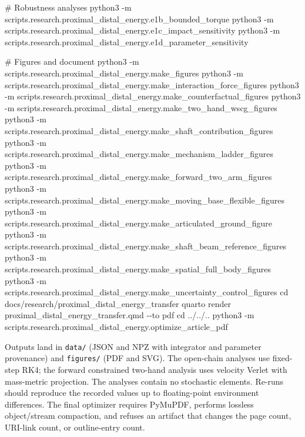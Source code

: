 \documentclass[
  letterpaper,
]{report}
\newenvironment{Shaded}{\begin{snugshade}}{\end{snugshade}}
\newcommand{\AttributeTok}[1]{\textcolor[rgb]{0.40,0.45,0.13}{#1}}
\newcommand{\BuiltInTok}[1]{\textcolor[rgb]{0.00,0.23,0.31}{#1}}
\newcommand{\CommentTok}[1]{\textcolor[rgb]{0.37,0.37,0.37}{#1}}
\newcommand{\ExtensionTok}[1]{\textcolor[rgb]{0.00,0.23,0.31}{#1}}
\newcommand{\NormalTok}[1]{\textcolor[rgb]{0.00,0.23,0.31}{#1}}
\begin{document}
\begin{Shaded}
\begin{Highlighting}[]
\CommentTok{\# Robustness analyses}
\ExtensionTok{python3} \AttributeTok{{-}m}\NormalTok{ scripts.research.proximal\_distal\_energy.e1b\_bounded\_torque}
\ExtensionTok{python3} \AttributeTok{{-}m}\NormalTok{ scripts.research.proximal\_distal\_energy.e1c\_impact\_sensitivity}
\ExtensionTok{python3} \AttributeTok{{-}m}\NormalTok{ scripts.research.proximal\_distal\_energy.e1d\_parameter\_sensitivity}

\CommentTok{\# Figures and document}
\ExtensionTok{python3} \AttributeTok{{-}m}\NormalTok{ scripts.research.proximal\_distal\_energy.make\_figures}
\ExtensionTok{python3} \AttributeTok{{-}m}\NormalTok{ scripts.research.proximal\_distal\_energy.make\_interaction\_force\_figures}
\ExtensionTok{python3} \AttributeTok{{-}m}\NormalTok{ scripts.research.proximal\_distal\_energy.make\_counterfactual\_figures}
\ExtensionTok{python3} \AttributeTok{{-}m}\NormalTok{ scripts.research.proximal\_distal\_energy.make\_two\_hand\_wscg\_figures}
\ExtensionTok{python3} \AttributeTok{{-}m}\NormalTok{ scripts.research.proximal\_distal\_energy.make\_shaft\_contribution\_figures}
\ExtensionTok{python3} \AttributeTok{{-}m}\NormalTok{ scripts.research.proximal\_distal\_energy.make\_mechanism\_ladder\_figures}
\ExtensionTok{python3} \AttributeTok{{-}m}\NormalTok{ scripts.research.proximal\_distal\_energy.make\_forward\_two\_arm\_figures}
\ExtensionTok{python3} \AttributeTok{{-}m}\NormalTok{ scripts.research.proximal\_distal\_energy.make\_moving\_base\_flexible\_figures}
\ExtensionTok{python3} \AttributeTok{{-}m}\NormalTok{ scripts.research.proximal\_distal\_energy.make\_articulated\_ground\_figure}
\ExtensionTok{python3} \AttributeTok{{-}m}\NormalTok{ scripts.research.proximal\_distal\_energy.make\_shaft\_beam\_reference\_figures}
\ExtensionTok{python3} \AttributeTok{{-}m}\NormalTok{ scripts.research.proximal\_distal\_energy.make\_spatial\_full\_body\_figures}
\ExtensionTok{python3} \AttributeTok{{-}m}\NormalTok{ scripts.research.proximal\_distal\_energy.make\_uncertainty\_control\_figures}
\BuiltInTok{cd}\NormalTok{ docs/research/proximal\_distal\_energy\_transfer}
\ExtensionTok{quarto}\NormalTok{ render proximal\_distal\_energy\_transfer.qmd }\AttributeTok{{-}{-}to}\NormalTok{ pdf}
\BuiltInTok{cd}\NormalTok{ ../../..}
\ExtensionTok{python3} \AttributeTok{{-}m}\NormalTok{ scripts.research.proximal\_distal\_energy.optimize\_article\_pdf}
\end{Highlighting}
\end{Shaded}

Outputs land in \texttt{data/} (JSON and NPZ with integrator and
parameter provenance) and \texttt{figures/} (PDF and SVG). The
open-chain analyses use fixed-step RK4; the forward constrained two-hand
analysis uses velocity Verlet with mass-metric projection. The analyses
contain no stochastic elements. Re-runs should reproduce the recorded
values up to floating-point environment differences. The final optimizer
requires PyMuPDF, performs lossless object/stream compaction, and
refuses an artifact that changes the page count, URI-link count, or
outline-entry count.
\end{document}
